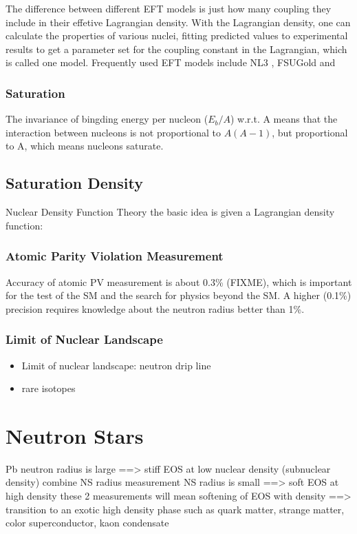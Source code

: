 The difference between different EFT models is just how many coupling they
include in their effetive Lagrangian density. With the Lagrangian density,
one can calculate the properties of various nuclei, fitting predicted values
to experimental results to get a parameter set for the coupling constant in
the Lagrangian, which is called one model. Frequently used EFT models include
NL3 \cite{}, FSUGold \cite{} and 





\subsubsection{Saturation}
The invariance of bingding energy per nucleon ($E_b/A$) w.r.t. A means that
the interaction between nucleons is not proportional to $A(A-1)$, but proportional
to A, which means nucleons saturate.
\subsection{Saturation Density}
Nuclear Density Function Theory
the basic idea is given a Lagrangian density function:

\subsubsection{Atomic Parity Violation Measurement}
Accuracy of atomic PV measurement is about 0.3\% (FIXME), which is important
for the test of the SM and the search for physics beyond the SM. A higher (0.1\%)
precision requires knowledge about the neutron radius better than 1\%. \cite{PhysRevC.46.2587}

\subsubsection{Limit of Nuclear Landscape}
\begin{itemize}
    \item Limit of nuclear landscape: neutron drip line
    \item rare isotopes
\end{itemize}

\section{Neutron Stars}
Pb neutron radius is large ==> stiff EOS at low nuclear density (subnuclear density)
combine NS radius measurement
NS radius is small ==> soft EOS at high density
these 2 measurements will mean softening of EOS with density ==> transition to
an exotic high density phase such as quark matter, strange matter, color
superconductor, kaon condensate

